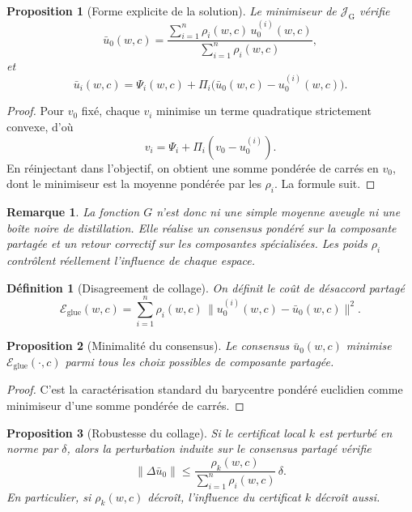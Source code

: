 \documentclass[11pt,a4paper]{article}
\newtheorem{definition}{Définition}[section]
\newtheorem{proposition}{Proposition}[section]
\newtheorem{remark}{Remarque}[section]
\newcommand{\1}{\mathbf 1}
\begin{document}
\begin{proposition}[Forme explicite de la solution]
Le minimiseur de \(\mathcal J_{\mathrm{G}}\) vérifie
\[
\bar u_0(w,c)
=
\frac{\sum_{i=1}^n \rho_i(w,c)\,u_0^{(i)}(w,c)}{\sum_{i=1}^n \rho_i(w,c)},
\]
et
\[
\bar u_i(w,c)
=
\Psi_i(w,c)
+
\Pi_i\bigl(\bar u_0(w,c)-u_0^{(i)}(w,c)\bigr).
\]
\end{proposition}

\begin{proof}
Pour \(v_0\) fixé, chaque \(v_i\) minimise un terme quadratique strictement convexe, d'où
\[
v_i=\Psi_i+\Pi_i(v_0-u_0^{(i)}).
\]
En réinjectant dans l'objectif, on obtient une somme pondérée de carrés en \(v_0\), dont le minimiseur est la moyenne pondérée par les \(\rho_i\).  
La formule suit.
\end{proof}

\begin{remark}
La fonction \(G\) n'est donc ni une simple moyenne aveugle ni une boîte noire de distillation.  
Elle réalise un consensus pondéré sur la composante partagée et un retour correctif sur les composantes spécialisées.  
Les poids \(\rho_i\) contrôlent réellement l'influence de chaque espace.
\end{remark}

\begin{definition}[Disagreement de collage]
On définit le coût de désaccord partagé
\[
\mathcal E_{\mathrm{glue}}(w,c)
=
\sum_{i=1}^n
\rho_i(w,c)\,\|u_0^{(i)}(w,c)-\bar u_0(w,c)\|^2.
\]
\end{definition}

\begin{proposition}[Minimalité du consensus]
Le consensus \(\bar u_0(w,c)\) minimise \(\mathcal E_{\mathrm{glue}}(\cdot,c)\) parmi tous les choix possibles de composante partagée.
\end{proposition}

\begin{proof}
C'est la caractérisation standard du barycentre pondéré euclidien comme minimiseur d'une somme pondérée de carrés.
\end{proof}

\begin{proposition}[Robustesse du collage]
Si le certificat local \(k\) est perturbé en norme par \(\delta\), alors la perturbation induite sur le consensus partagé vérifie
\[
\|\Delta \bar u_0\|
\le
\frac{\rho_k(w,c)}{\sum_{i=1}^n \rho_i(w,c)}\,\delta.
\]
En particulier, si \(\rho_k(w,c)\) décroît, l'influence du certificat \(k\) décroît aussi.
\end{proposition}
\end{document}
